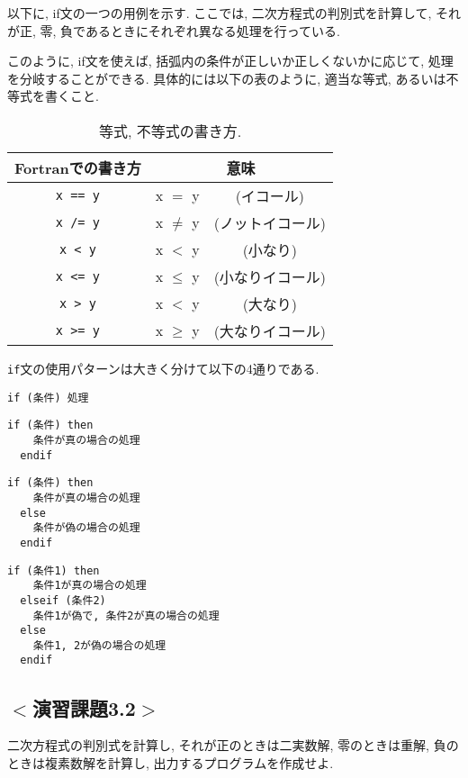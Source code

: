 以下に, {\ttfamily if}文の一つの用例を示す. 
ここでは, 二次方程式の判別式を計算して, それが正, 零, 負であるときにそれぞれ異なる処理を行っている. 



このように, {\ttfamily if}文を使えば, 括弧内の条件が正しいか正しくないかに応じて, 処理を分岐することができる.
具体的には以下の表のように, 適当な等式, あるいは不等式を書くこと.

\begin{table}[h]
  \caption{等式, 不等式の書き方. }
  \begin{center}
    \begin{tabular}{ccc}
      \hline
      Fortranでの書き方   & \multicolumn{2}{c}{意味} \\ \hline
      \verb|x == y|   & x $=$ y &(イコール)\\
      \verb|x /= y|   & x $\ne$ y &(ノットイコール)\\
      \verb|x < y|    & x $<$ y &(小なり)\\
      \verb|x <= y|   & x $\le$ y &(小なりイコール)\\
      \verb|x > y|    & x $<$ y &(大なり)\\
      \verb|x >= y|   & x $\ge$ y &(大なりイコール)\\ \hline
    \end{tabular}
  \end{center}
\end{table}

\verb|if|文の使用パターンは大きく分けて以下の4通りである. 
\begin{Verbatim}[frame=single]
  if (条件) 処理
\end{Verbatim}
\begin{Verbatim}[frame=single]
  if (条件) then
    条件が真の場合の処理
  endif
\end{Verbatim}
\begin{Verbatim}[frame=single]
  if (条件) then
    条件が真の場合の処理
  else
    条件が偽の場合の処理
  endif
\end{Verbatim}
\begin{Verbatim}[frame=single]
  if (条件1) then
    条件1が真の場合の処理
  elseif (条件2)
    条件1が偽で, 条件2が真の場合の処理
  else
    条件1, 2が偽の場合の処理
  endif
\end{Verbatim}




\subsection*{$<$演習課題3.2$>$}
二次方程式の判別式を計算し, それが正のときは二実数解,
零のときは重解, 負のときは複素数解を計算し, 出力するプログラムを作成せよ.


